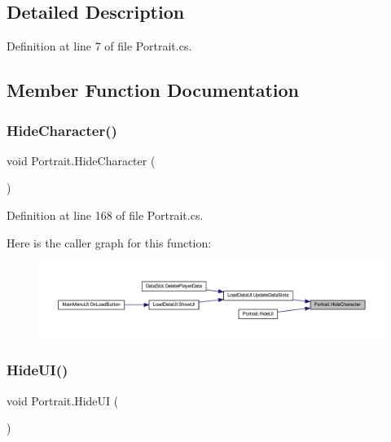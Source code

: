 \subsection{Detailed Description}


Definition at line 7 of file Portrait.\+cs.



\subsection{Member Function Documentation}
\mbox{\label{class_portrait_a3a0b6a4d3c9909127c51c4c4f4b152f5}} 
\subsubsection{\texorpdfstring{HideCharacter()}{HideCharacter()}}
{\footnotesize\ttfamily void Portrait.\+Hide\+Character (\begin{DoxyParamCaption}{ }\end{DoxyParamCaption})}



Definition at line 168 of file Portrait.\+cs.

Here is the caller graph for this function\+:
\nopagebreak
\begin{figure}[H]
\begin{center}
\leavevmode
\includegraphics[width=350pt]{class_portrait_a3a0b6a4d3c9909127c51c4c4f4b152f5_icgraph}
\end{center}
\end{figure}
\mbox{\label{class_portrait_ac5ab4bb350640a35c516bffa2fc45fe3}} 
\subsubsection{\texorpdfstring{HideUI()}{HideUI()}}
{\footnotesize\ttfamily void Portrait.\+Hide\+UI (\begin{DoxyParamCaption}{ }\end{DoxyParamCaption})}



